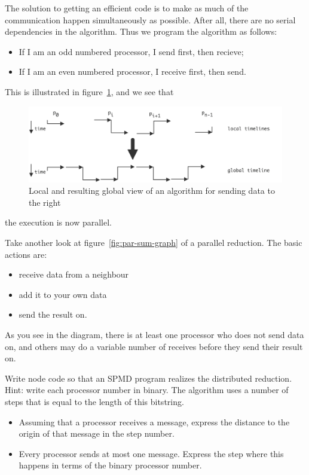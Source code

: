 The solution to getting an efficient code is to make as much of the
communication happen simultaneously as possible. After all, there are
no serial dependencies in the algorithm. Thus we program the algorithm
as follows:
\begin{itemize}
\item If I am an odd numbered processor, I send first, then recieve;
\item If I am an even numbered processor, I receive first, then send.
\end{itemize}
This is illustrated in figure~\ref{fig:wave_right_3}, and we see that
\begin{figure}
  \includegraphics[scale=.115]{graphics/wave_right_3}
  \caption{Local and resulting global view of an algorithm for sending
    data to the right}
  \label{fig:wave_right_3}
\end{figure}
the execution is now parallel.

\begin{exercise}
  Take another look at figure~\ref{fig:par-sum-graph} of a parallel
  reduction. The basic actions are:
  \begin{itemize}
  \item receive data from a neighbour
  \item add it to your own data
  \item send the result on.
  \end{itemize}
  As you see in the diagram, there is at least one processor who does
  not send data on, and others may do a variable number of receives
  before they send their result on.

  Write node code so that an \ac{SPMD} program realizes the
  distributed reduction. Hint: write each processor number in
  binary. The algorithm uses a number of steps that is equal to the
  length of this bitstring.
  \begin{itemize}
  \item Assuming that a processor receives a message, express the
    distance to the origin of that message in the step number.
  \item Every processor sends at most one message. Express the step 
    where this happens in terms of the binary processor number.
  \end{itemize}
\end{exercise}

